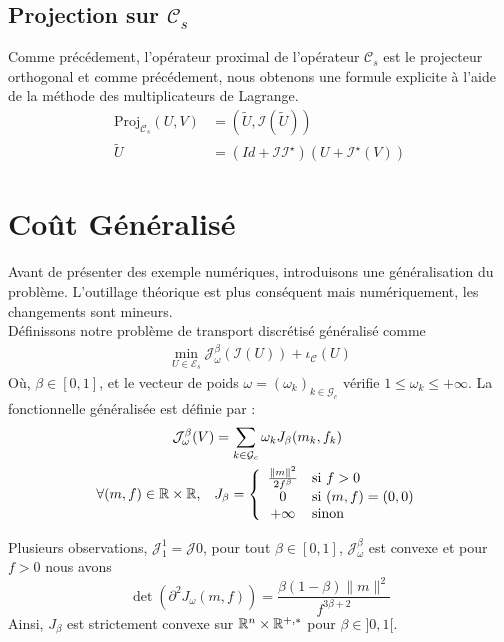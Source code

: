 \documentclass[a4paper,12pt]{article}
\newcommand{\proj}{\text{Proj}}
\begin{document}
\subsection{Projection sur $\mathcal{C}_s$}
Comme précédement, l'opérateur proximal de l'opérateur $\mathcal{C}_s$ est le projecteur orthogonal et comme précédement, nous obtenons une formule explicite à l'aide de la méthode des multiplicateurs de Lagrange. 
\begin{align}
\proj_{\mathcal{C}_s}(U,V) &= (\tilde{U},\mathcal{I}(\tilde{U}))\\
\tilde{U}&= (Id+\mathcal{I}\mathcal{I}^{\star})(U+\mathcal{I}^{\star}(V))
\end{align}


\section{Coût Généralisé}
Avant de présenter des exemple numériques, introduisons une généralisation du problème. L'outillage théorique est plus conséquent mais numériquement, les changements sont mineurs. \\
Définissons notre problème de transport discrétisé généralisé comme
\begin{align}
\min_{U\in\mathcal{E}_s}\mathcal{J}_{\omega}^{\beta}(\mathcal{I}(U))+\iota_{\mathcal{C}}(U)
\end{align}
Où, $\beta\in[0,1]$, et le vecteur de poids $\omega=(\omega_k)_{k\in\mathcal{G}_c}$ vérifie $1\leq \omega_k\leq +\infty$. La fonctionnelle généralisée est définie par : 
\begin{align}
\mathcal{J}_{\omega}^{\beta}(V) &= \sum_{k\in\mathcal{G}_c} \omega_kJ_{\beta}(m_k,f_k)\\
\forall (m,f)\in\mathbb{R}\times\mathbb{R},\quad &J_{\beta}=\left\{ \begin{array}{cl}
\frac{\|m\|^2}{2f^{\beta}} & \text{si } f>0 \\
0 &\text{si } (m,f) = (0,0)\\
+\infty & \text{sinon} 
\end{array}\right.
\end{align}

Plusieurs observations, $\mathcal{J}_1^1=\mathcal{J0}$, pour tout $\beta\in [0,1]$, $\mathcal{J}_{\omega}^{\beta}$ est convexe et pour $f> 0$ nous avons 
$$
\det(\partial ^2J_{\omega}(m,f)) = \frac{\beta(1-\beta)\|m\|^2}{f^{3\beta+2}}
$$
Ainsi, $J_{\beta}$ est strictement convexe sur $\mathbb{R}^n\times\mathbb{R}^{+,*}$ pour $\beta \in]0,1[$. \\
\end{document}
